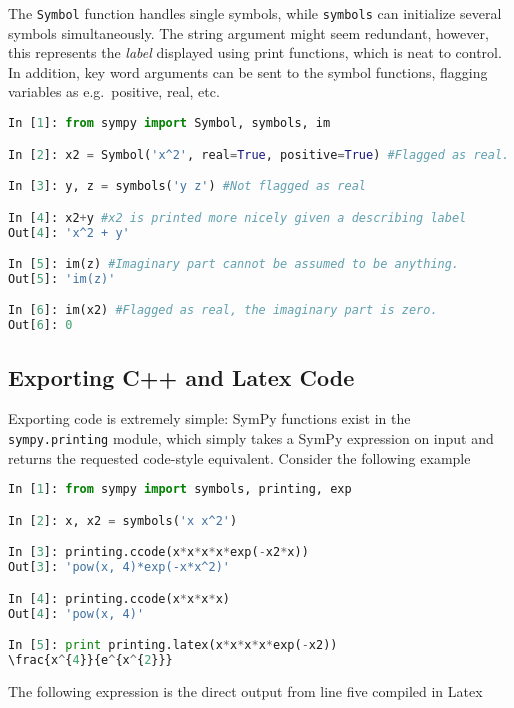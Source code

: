 The \verb+Symbol+ function handles single symbols, while \verb+symbols+ can initialize several symbols simultaneously. The string argument might seem redundant, however, this represents the \textit{label} displayed using print functions, which is neat to control. In addition, key word arguments can be sent to the symbol functions, flagging variables as e.g.~positive, real, etc.

\vspace{0.25cm}
\begin{lstlisting}[language=Python]
In [1]: from sympy import Symbol, symbols, im

In [2]: x2 = Symbol('x^2', real=True, positive=True) #Flagged as real. Note the label.

In [3]: y, z = symbols('y z') #Not flagged as real

In [4]: x2+y #x2 is printed more nicely given a describing label
Out[4]: 'x^2 + y'

In [5]: im(z) #Imaginary part cannot be assumed to be anything.
Out[5]: 'im(z)'

In [6]: im(x2) #Flagged as real, the imaginary part is zero.
Out[6]: 0

\end{lstlisting}

\subsection{Exporting C++ and Latex Code}

Exporting code is extremely simple: SymPy functions exist in the \verb+sympy.printing+ module, which simply takes a SymPy expression on input and returns the requested code-style equivalent. Consider the following example

\vspace{0.25cm}
\begin{lstlisting}[language=Python]
In [1]: from sympy import symbols, printing, exp

In [2]: x, x2 = symbols('x x^2')

In [3]: printing.ccode(x*x*x*x*exp(-x2*x))
Out[3]: 'pow(x, 4)*exp(-x*x^2)'

In [4]: printing.ccode(x*x*x*x)
Out[4]: 'pow(x, 4)'

In [5]: print printing.latex(x*x*x*x*exp(-x2))
\frac{x^{4}}{e^{x^{2}}}

\end{lstlisting}

The following expression is the direct output from line five compiled in Latex


